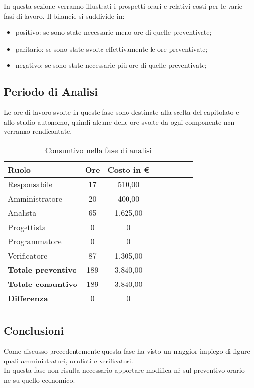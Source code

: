 \documentclass[../piano_di_progetto.tex]{subfiles}
\begin{document}
In questa sezione verranno illustrati i prospetti orari e relativi costi per le varie fasi di lavoro. Il bilancio si suddivide in:
\begin{itemize}
\item positivo: se sono state necessarie meno ore di quelle preventivate;
\item paritario: se sono state svolte effettivamente le ore preventivate;
\item negativo: se sono state necessarie più ore di quelle preventivate;
\end{itemize}

\subsection{ Periodo di Analisi}%
\label{sub:cons_analisi}
Le ore di lavoro svolte in queste fase sono destinate alla scelta del capitolato e allo studio autonomo, quindi alcune delle ore svolte da ogni componente non verranno rendicontate.

\begin{center}
	\begin{longtable}{|l|c|c|c|c|c|c|c|}
		\hline
		\rowcolor{lightgray}
		\textbf{Ruolo} & \textbf{Ore} & \textbf{Costo in €}\\
		\hline
		Responsabile & 17 & 510,00 \\
		\hline
		Amministratore & 20 & 400,00 \\
		\hline
		Analista & 65 & 1.625,00 \\
		\hline
		Progettista & 0 & 0 \\
		\hline
		Programmatore & 0 & 0 \\
		\hline
		Verificatore & 87 & 1.305,00 \\
		\hline
		\textbf{Totale preventivo} & 189 & 3.840,00 \\
		\hline
		\textbf{Totale consuntivo} & 189 & 3.840,00 \\
		\hline
		\textbf{Differenza} & 0 & 0\\
		\hline
		\rowcolor{white}
		\caption{Consuntivo nella fase di analisi}
	\end{longtable}
\end{center}

\subsection{ Conclusioni}%
\label{sub:cons_fine}
Come discusso precedentemente questa fase ha visto un maggior impiego di figure quali amministratori, analisti e verificatori.\\
In questa fase non risulta necessario apportare modifica né sul preventivo orario ne su quello economico. 
\end{document}
